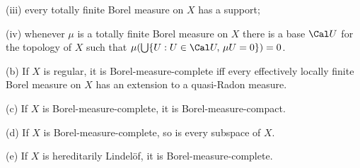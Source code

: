 \quad(iii) every totally finite Borel measure on $X$ has
a support;

\quad(iv) whenever $\mu$ is a totally finite Borel measure on $X$ there
is a base $\Cal U$ for the topology of $X$ such that
$\mu(\bigcup\{U:U\in\Cal U,\,\mu U=0\})=0$.

(b) If $X$ is regular, it is Borel-measure-complete
iff every effectively locally finite Borel measure on $X$ has an
extension to a quasi-Radon measure.

(c) If $X$ is Borel-measure-complete, it is Borel-measure-compact.

(d) If $X$ is Borel-measure-complete, so is every subspace of $X$.

(e) If $X$ is hereditarily Lindel\"of, it is
Borel-measure-complete.

